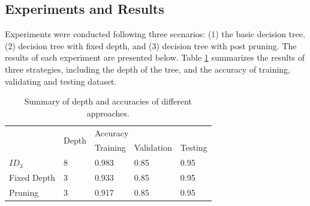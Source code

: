 \documentclass[11pt]{article}
\begin{document}
\subsection{Experiments and Results}
Experiments were conducted following three scenarios: (1) the basic decision tree, (2) decision tree with fixed depth, and (3) decision tree with post pruning. The results of each experiment are presented below. Table \ref{table:sum} summarizes the results of three strategies, including the depth of the tree, and the accuracy of training, validating and testing dataset. %
\begin{table}[htdp]
\centering
\caption{Summary of depth and accuracies of different approaches.}
\label{table:sum}
\begin{tabular}{lllll}
\hline
\multirow{2}{*}{} & \multicolumn{1}{c}{\multirow{2}{*}{Depth}} & \multicolumn{3}{l}{Accuracy}    \\ 
                  & \multicolumn{1}{c}{}                       & Training & Validation & Testing \\ \hline 
\(ID_3\)               & 8                                          & 0.983    & 0.85       & 0.95    \\
Fixed Depth       & 3                                          & 0.933    & 0.85       & 0.95    \\
Pruning           & 3                                          &    0.917     & 0.85       & 0.95 \\ \hline
\end{tabular}
\end{table}
\end{document}
